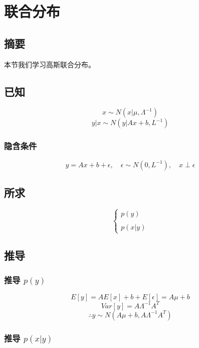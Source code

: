 \documentclass{report}
\begin{document}
\section{联合分布}
\subsection{摘要}
本节我们学习高斯联合分布。
\subsection{已知}
$$
x \sim N(x|\mu, \Lambda^{-1})
$$
$$
y|x \sim N(y|Ax+b, L^{-1})
$$
\subsubsection{隐含条件}
$$
y = Ax+b+\epsilon, \quad \epsilon \sim N(0, L^{-1}), \quad x \perp \epsilon
$$
\subsection{所求}
$$
\begin{cases}
p(y)\\
\\
p(x|y)
\end{cases}
$$
\subsection{推导}
\subsubsection{推导 $p(y)$}
$$
E[y] = A E[x] + b + E[\epsilon]=A \mu + b
$$
$$
Var[y] = A \Lambda^{-1} A^T
$$
$$
\therefore y \sim N(A\mu +b, A\Lambda^{-1} A^T)
$$
\subsubsection{推导 $p(x|y)$}
\end{document}
